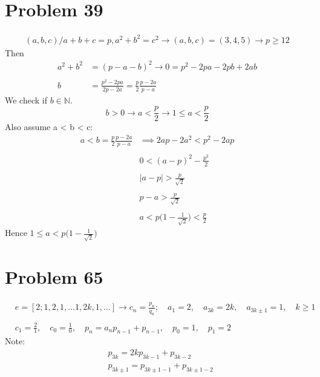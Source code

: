 \documentclass[12pt]{article}
\begin{document}
\section{Problem 39}
\begin{align*}
    (a, b, c) / a+b+c = p, a^2+b^2=c^2 \rightarrow (a,b,c) = (3,4,5) \rightarrow p\geq 12
\end{align*}
Then
\begin{align*}
    a^2 + b^2 &= (p-a-b)^2 \rightarrow 0 = p^2 -2pa-2pb+2ab \\\\
    b &= \frac{p^2-2pa}{2p-2a} = \frac{p}{2} \frac{p-2a}{p-a}
\end{align*}
We check if $b \in \mathbb{N}$.
$$
    b > 0 \rightarrow a < \frac{p}{2} \rightarrow 1 \leq a < \frac{p}{2}
$$
Also assume a < b < c:
\begin{align*}
    a < b = \frac{p}{2} \frac{p-2a}{p-a} &\implies 2ap-2a^2 < p^2-2ap\\\\
    & 0 < (a-p)^2-\frac{p^2}{2}\\\\
    & |a-p| > \frac{p}{\sqrt{2}}\\\\
    & p-a > \frac{p}{\sqrt{2}} \\\\
    & a < p\bigg(1-\frac{1}{\sqrt{2}} \bigg) < \frac{p}{2}
\end{align*}
Hence $1 \leq a < p\bigg(1-\frac{1}{\sqrt{2}} \bigg)$
\section{Problem 65}
\begin{align*}
    &e = [2; 1,2,1, \ldots 1, 2k, 1, \ldots] \rightarrow c_n = \frac{p_n}{q_n}; \quad a_1 = 2, \quad a_{3k} = 2k, \quad a_{3k \pm 1} = 1,\quad  k\geq 1 \\\\
    &c_1 = \frac{2}{1}, \quad c_0 = \frac{1}{0},\quad  p_n = a_np_{n-1} + p_{n-1}, \quad p_0 = 1, \quad p_1 = 2
\end{align*}
Note:
\begin{align*}
    &p_{3k} = 2kp_{3k-1} + p_{3k-2}\\
    &p_{3k\pm 1} = p_{3k \pm 1 -1} + p_{3k \pm 1 -2}
\end{align*}
\end{document}
